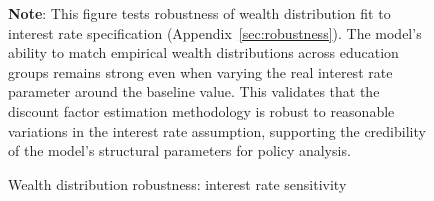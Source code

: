 \documentclass[\latexroot/\projectname]{subfiles}
\begin{document}
\begin{figure}[htb]
  \centering
  \caption{\pregenmark Wealth distribution robustness: interest rate sensitivity}
  \whenintegrated{\label{fig:LorenzPts_robustness_R}} %

  \medskip
  \noindent\parbox{\textwidth}{\footnotesize
    \textbf{Note}: This figure tests robustness of wealth distribution fit to interest rate specification
    (Appendix~\ref{sec:robustness}).
    The model's ability to match empirical wealth distributions across education groups
    remains strong even when varying the real interest rate parameter around the baseline value.
    This validates that the discount factor estimation methodology is robust to reasonable
    variations in the interest rate assumption, supporting the credibility of the model's
    structural parameters for policy analysis.
  }
\end{figure}

\smartbib
\end{document}
